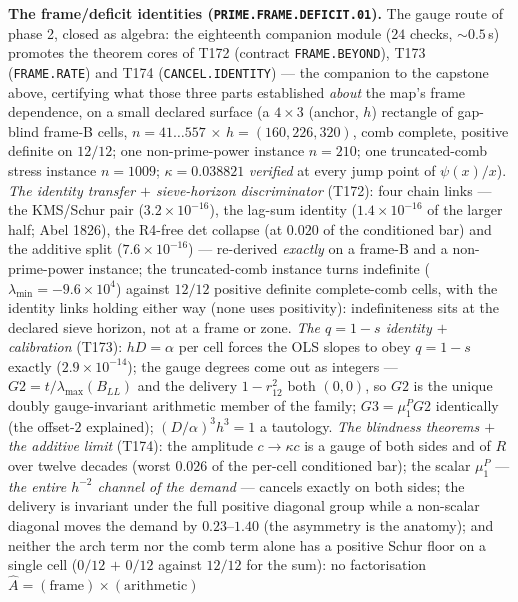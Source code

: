 \documentclass[11pt,a4paper]{article}
\theoremstyle{definition}
\begin{document}
\par\smallskip\noindent\textbf{The frame/deficit identities
(\texttt{PRIME.FRAME.DEFICIT.01}).}
The gauge route of phase 2, closed as algebra: the eighteenth companion
module ($24$ checks, ${\sim}0.5$\,s) promotes the theorem cores of
T172 (contract \texttt{FRAME.BEYOND}), T173 (\texttt{FRAME.RATE}) and
T174 (\texttt{CANCEL.IDENTITY}) --- the companion to the capstone
above, certifying what those three parts established \emph{about} the
map's frame dependence, on a small declared surface (a $4\times3$
(anchor, $h$) rectangle of gap-blind frame-B cells, $n=41\ldots557$
$\times$ $h=(160,226,320)$, comb complete, positive definite on
$12/12$; one non-prime-power instance $n=210$; one truncated-comb
stress instance $n=1009$; $\kappa=0.038821$ \emph{verified} at every
jump point of $\psi(x)/x$).
\emph{The identity transfer $+$ sieve-horizon discriminator} (T172):
four chain links --- the KMS/Schur pair ($3.2\times10^{-16}$), the
lag-sum identity ($1.4\times10^{-16}$ of the larger half; Abel 1826),
the R4-free det collapse (at $0.020$ of the conditioned bar) and the
additive split ($7.6\times10^{-16}$) --- re-derived \emph{exactly} on a
frame-B and a non-prime-power instance; the truncated-comb instance
turns indefinite ($\lambda_{\min}=-9.6\times10^{4}$) against $12/12$
positive definite complete-comb cells, with the identity links holding
either way (none uses positivity): indefiniteness sits at the declared
sieve horizon, not at a frame or zone.
\emph{The $q=1-s$ identity $+$ calibration} (T173): $hD=\alpha$ per
cell forces the OLS slopes to obey $q=1-s$ exactly
($2.9\times10^{-14}$); the gauge degrees come out as integers ---
$G2=t/\lambda_{\max}(B_{LL})$ and the delivery $1-r_{12}^2$ both
$(0,0)$, so $G2$ is the unique doubly gauge-invariant arithmetic member
of the family; $G3=\mu^P_1G2$ identically (the offset-$2$ explained);
$(D/\alpha)^3h^3=1$ a tautology.
\emph{The blindness theorems $+$ the additive limit} (T174): the
amplitude $c\to\kappa c$ is a gauge of both sides and of $R$ over
twelve decades (worst $0.026$ of the per-cell conditioned bar); the
scalar $\mu^P_1$ --- \emph{the entire $h^{-2}$ channel of the demand}
--- cancels exactly on both sides; the delivery is invariant under the
full positive diagonal group while a non-scalar diagonal moves the
demand by $0.23$--$1.40$ (the asymmetry is the anatomy); and neither
the arch term nor the comb term alone has a positive Schur floor on a
single cell ($0/12$ $+$ $0/12$ against $12/12$ for the sum): no
factorisation $\hat A=(\mathrm{frame})\times(\mathrm{arithmetic})$
\end{document}
